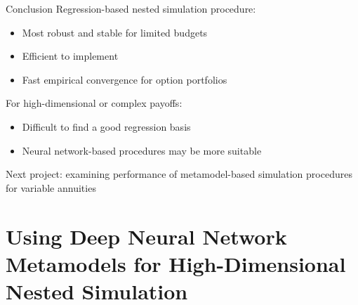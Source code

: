 \documentclass[9pt,handout]{beamer}
\begin{document}
\begin{frame}{Conclusion}
    Regression-based nested simulation procedure:
    \begin{itemize}
        \item Most robust and stable for limited budgets
        \item Efficient to implement
        \item Fast empirical convergence for option portfolios
    \end{itemize}

    \vspace{10pt}

    For high-dimensional or complex payoffs:
    \begin{itemize}
        \item Difficult to find a good regression basis
        \item Neural network-based procedures may be more suitable
    \end{itemize}

    \vspace{10pt}

    Next project: examining performance of metamodel-based simulation procedures for variable annuities


\end{frame}

\section{Using Deep Neural Network Metamodels for High-Dimensional Nested Simulation}
\end{document}
